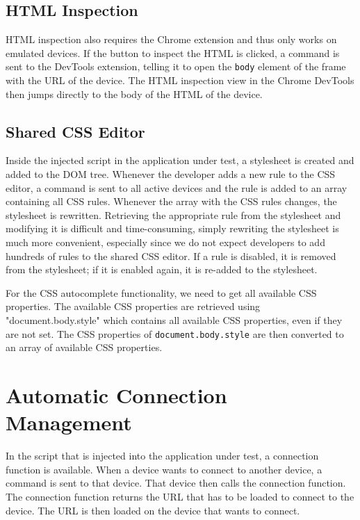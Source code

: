 \subsection{HTML Inspection}

HTML inspection also requires the Chrome extension and thus only works on emulated devices. If the button to inspect the HTML is clicked, a command is sent to the DevTools extension, telling it to open the \lstinline|body| element of the frame with the URL of the device. The HTML inspection view in the Chrome DevTools then jumps directly to the body of the HTML of the device.

\subsection{Shared CSS Editor}

Inside the injected script in the application under test, a stylesheet is created and added to the DOM tree. Whenever the developer adds a new rule to the CSS editor, a command is sent to all active devices and the rule is added to an array containing all CSS rules. Whenever the array with the CSS rules changes, the stylesheet is rewritten. Retrieving the appropriate rule from the stylesheet and modifying it is difficult and time-consuming, simply rewriting the stylesheet is much more convenient, especially since we do not expect developers to add hundreds of rules to the shared CSS editor. If a rule is disabled, it is removed from the stylesheet; if it is enabled again, it is re-added to the stylesheet.

For the CSS autocomplete functionality, we need to get all available CSS properties. The available CSS properties are retrieved using "document.body.style" which contains all available CSS properties, even if they are not set. The CSS properties of \lstinline|document.body.style| are then converted to an array of available CSS properties.

\section{Automatic Connection Management}

In the script that is injected into the application under test, a connection function is available. When a device wants to connect to another device, a command is sent to that device. That device then calls the connection function. The connection function returns the URL that has to be loaded to connect to the device. The URL is then loaded on the device that wants to connect.


